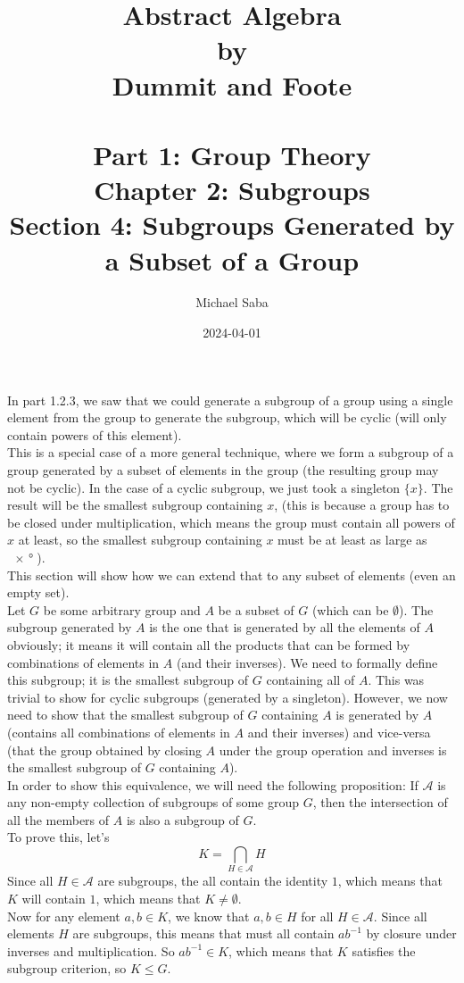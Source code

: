 \documentclass[12pt]{article}
\title{%
    \Huge Abstract Algebra \\
    \large by \\
    \Large Dummit and Foote \\~\\
    \huge Part 1: Group Theory \\
    \LARGE Chapter 2: Subgroups \\
    \Large Section 4: Subgroups Generated by a Subset of a Group
}
\date{2024-04-01}
\author{Michael Saba}
\begin{document}
    \maketitle
    \newpage
    \setlength{\parindent}{0pt}

    In part 1.2.3, we saw that we could generate a subgroup
    of a group using a single element from the group to
    generate the subgroup,
    which will be cyclic (will only contain powers of this element). \\
    This is a special case of a more general technique,
    where we form a subgroup of a group generated by
    a subset of elements in the group
    (the resulting group may not be cyclic). 
    In the case of a cyclic subgroup,
    we just took a singleton $\{x\}$.
    The result will be the smallest subgroup containing $x$,
    (this is because a group has to be closed under multiplication,
    which means the group must contain all powers of $x$ at least,
    so the smallest subgroup containing $x$ must be at least
    as large as $\ang{x}$). \\
    This section will show how we can extend that to any subset
    of elements (even an empty set). \\

    Let $G$ be some arbitrary group and $A$ be a subset of $G$
    (which can be $\emptyset$).
    The subgroup generated by $A$ is the one that is generated
    by all the elements of $A$ obviously;
    it means it will contain all the products that can be formed by
    combinations of elements in $A$ (and their inverses).
    We need to formally define this subgroup;
    it is the smallest subgroup of $G$ containing all of $A$.
    This was trivial to show for cyclic subgroups
    (generated by a singleton).
    However, we now need to show that
    the smallest subgroup of $G$ containing $A$
    is generated by $A$
    (contains all combinations of elements in $A$
    and their inverses)
    and vice-versa
    (that the group obtained by closing $A$
    under the group operation and inverses
    is the smallest subgroup of $G$ containing $A$). \\

    In order to show this equivalence,
    we will need the following proposition:
    If $\mathcal{A}$ is any non-empty collection of subgroups of
    some group $G$,
    then the intersection of all the members of $A$
    is also a subgroup of $G$. \\
    To prove this, let's 
    \[ K = \bigcap_{H \in \mathcal{A}} H \]
    Since all $H \in \mathcal{A}$ are subgroups,
    the all contain the identity $1$,
    which means that $K$ will contain $1$,
    which means that $K \neq \emptyset$. \\
    Now for any element $a, b \in K$,
    we know that $a, b \in H$ for all $H \in \mathcal{A}$.
    Since all elements $H$ are subgroups,
    this means that must all contain $ab^{-1}$
    by closure under inverses and multiplication.
    So $ab^{-1} \in K$,
    which means that $K$ satisfies the subgroup criterion,
    so $K \leqslant G$. \\
\end{document}
